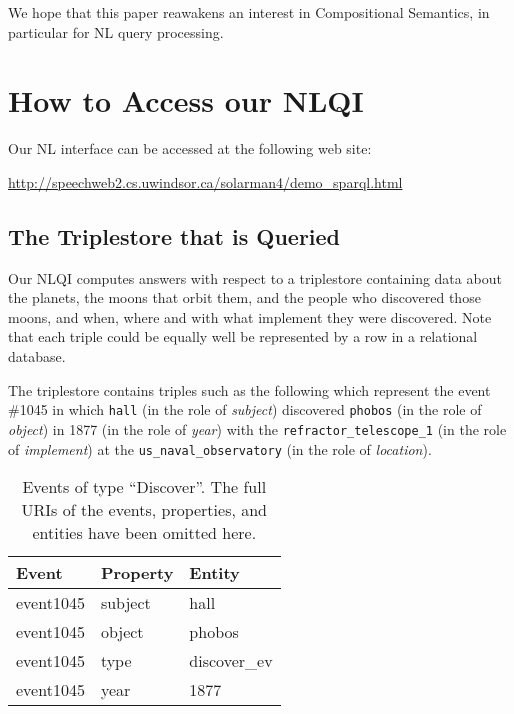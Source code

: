 \documentclass[../main.tex]{subfiles}
\begin{document}
\begin{refsection}
We hope that this paper reawakens an interest in Compositional Semantics, in particular for NL query processing.

\section{How to Access our NLQI}
\label{webist2019conf:access}

Our NL interface can be accessed at the following web site:

\begin{center}
	\url{http://speechweb2.cs.uwindsor.ca/solarman4/demo_sparql.html}
\end{center}

\subsection{The Triplestore that is Queried}
\label{webist2019conf:triplestore}
Our NLQI computes answers with respect to a triplestore containing data about the planets, the moons that orbit them, and the people who discovered those moons, and when, where and with what implement they were discovered. Note that each triple could be equally well be represented by a row in a relational database.

The triplestore contains triples such as the following which represent the event \#1045 in which \texttt{hall} (in the role of \textit{subject}) discovered \texttt{phobos} (in the role of \textit{object}) in 1877 (in the role of \textit{year}) with the \texttt{refractor\_telescope\_1} (in the role of \textit{implement})  at the \texttt{us\_naval\_observatory} (in the role of \textit{location}).

\begin{table}
	\caption{Events of type ``Discover''. The full URIs of the events, properties, and entities have been omitted here.}
	\label{webist2019conf:evdiscover}
	\centering
	\begin{tabular}{lll}
		\toprule
		Event & Property & Entity \\
		\midrule
		event1045 &
		subject &
		hall \\
		
		event1045 &
		object &
		phobos \\
		
		event1045 &
		type &
		discover\_ev \\
		
		event1045 &
		year &
		1877 \\
		

\end{tabular}
\end{table}
\end{refsection}
\end{document}
